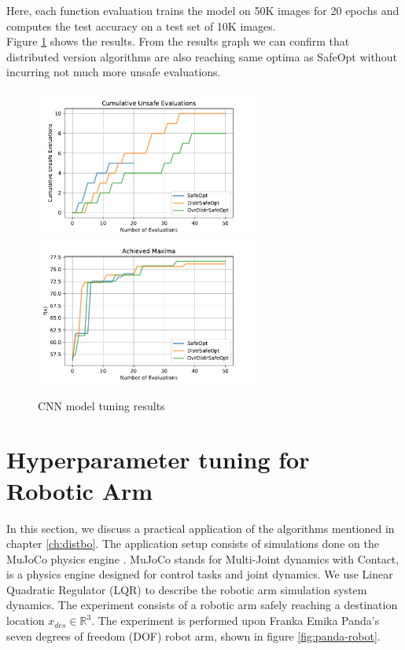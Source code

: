 Here, each function evaluation trains the model on 50K images for 20 epochs and computes the test accuracy on a test set of 10K images.\\
Figure \ref{fig:cnn-result} shows the results. From the results graph we can confirm that distributed version algorithms are also reaching same optima as SafeOpt without incurring not much more unsafe evaluations.
\begin{figure}[H]
	\centering
	\includegraphics[width=0.65\textwidth]{figures/results/cnn-cum-unsafe.pdf}
	\includegraphics[width=0.65\textwidth]{figures/results/cnn-maxima.pdf}
	\caption{CNN model tuning results}
	\label{fig:cnn-result}
\end{figure}


\section{Hyperparameter tuning for Robotic Arm}
\label{sec:robotic}
In this section, we discuss a practical application of the algorithms mentioned in chapter \ref{ch:distbo}. The application setup consists of simulations done on the MuJoCo physics engine \cite{mujoco}. MuJoCo stands for Multi-Joint dynamics with Contact, is a physics engine designed for control tasks and joint dynamics. We use Linear Quadratic Regulator (LQR) to describe the robotic arm simulation system dynamics. The experiment consists of a robotic arm safely reaching a destination location $x_{des} \in \mathbb{R}^3$. The experiment is performed upon Franka Emika Panda's seven degrees of freedom (DOF) robot arm, shown in figure \ref{fig:panda-robot}.

